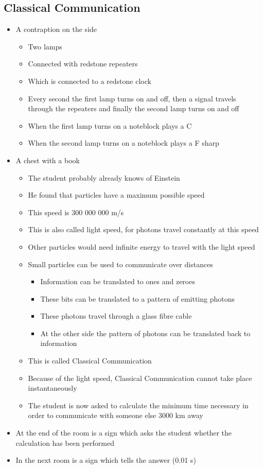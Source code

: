 \documentclass[11pt,twoside]{report} %
\begin{document}
\subsection{Classical Communication}
\begin{itemize}
	\item A contraption on the side
	\begin{itemize}
		\item Two lamps
		\item Connected with redstone repeaters
		\item Which is connected to a redstone clock
		\item Every second the first lamp turns on and off, then a signal travels through the repeaters and finally the second lamp turns on and off
		\item When the first lamp turns on a noteblock plays a C
		\item When the second lamp turns on a noteblock plays a F sharp
	\end{itemize}
	\item A chest with a book
	\begin{itemize}
		\item The student probably already knows of Einstein
		\item He found that particles have a maximum possible speed
		\item This speed is 300 000 000 m/s
		\item This is also called light speed, for photons travel constantly at this speed
		\item Other particles would need infinite energy to travel with the light speed
		\item Small particles can be used to communicate over distances
		\begin{itemize}
			\item Information can be translated to ones and zeroes
			\item These bits can be translated to a pattern of emitting photons
			\item These photons travel through a glass fibre cable
			\item At the other side the pattern of photons can be translated back to information
		\end{itemize}
		\item This is called Classical Communication
		\item Because of the light speed, Classical Communication cannot take place instantaneously
		\item The student is now asked to calculate the minimum time necessary in order to communicate with someone else 3000 km away
	\end{itemize}
	\item At the end of the room is a sign which asks the student whether the calculation has been performed
	\item In the next room is a sign which tells the answer (0.01 s)
\end{itemize}
\end{document}

